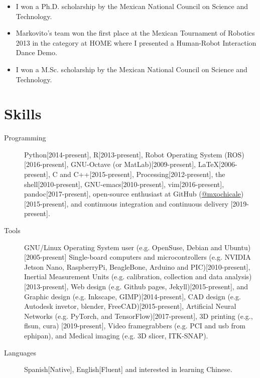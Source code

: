 \documentclass{mycv}
\begin{document}
\begin{itemize}
\item I won a Ph.D. scholarship by the Mexican National Council on Science and Technology. 

\item Markovito's team  won the first place at the Mexican Tournament of Robotics 2013 in the category at HOME where I presented a Human-Robot Interaction Dance Demo. \href{https://www.youtube.com/watch?v=Kw-lZam_qZI}{\faYoutube} 

\item I won a M.Sc. scholarship by the Mexican National Council on Science and Technology. 
\end{itemize}

\section{Skills}
\begin{description}

\item[Programming] Python[2014-present],
R[2013-present], 
Robot Operating System (ROS)[2016-present],
GNU-Octave (or MatLab)[2009-present],
\LaTeX [2006-present], 
C and C++[2015-present],
Processing[2012-present], 
the shell[2010-present], 
GNU-emacs[2010-present],
vim[2016-present], 
pandoc[2017-present],
open-source enthusiast at GitHub (\href{https://github.com/mxochicale}{@mxochicale})[2015-present], 
and continuous integration and continuous delivery [2019-present]. 


  \item[Tools] 
GNU/Linux Operating System user (e.g. OpenSuse, Debian and Ubuntu)[2005-present]
Single-board computers and microcontrollers (e.g. 
NVIDIA Jetson Nano, RaspberryPi, BeagleBone, Arduino and PIC)[2010-present],
Inertial Measurement Units (e.g. calibration, collection and data analysis)[2013-present], 
Web design (e.g. Github pages, Jekyll)[2015-present], and
Graphic design (e.g. Inkscape, GIMP)[2014-present],
CAD design (e.g. Autodesk invetor, blender, FreeCAD)[2015-present], 
Artificial Neural Networks (e.g. PyTorch, and TensorFlow)[2017-present], 
3D printing (e.g., flsun, cura) [2019-present], 
Video framegrabbers (e.g. PCI and usb from ephipan), and 
Medical imaging (e.g. 3D slicer, ITK-SNAP).
  \item[Languages] Spanish[Native], English[Fluent] and interested in learning Chinese.
\end{description}
\end{document}
